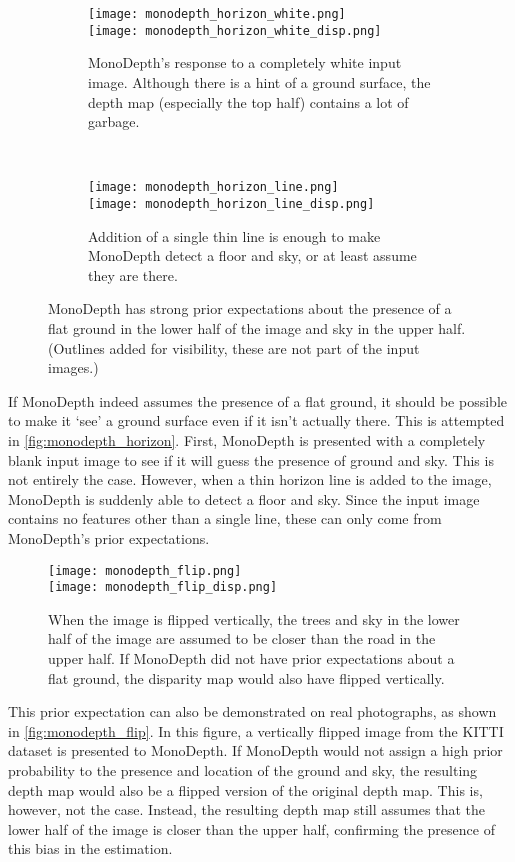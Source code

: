 \begin{figure}
\centering
\begin{subfigure}[t]{0.45\textwidth}
\texttt{[image: monodepth\_horizon\_white.png]}\\
\texttt{[image: monodepth\_horizon\_white\_disp.png]}
\caption{MonoDepth's response to a completely white input image. Although there is a hint of a ground surface, the depth map (especially the top half) contains a lot of garbage.}
\end{subfigure}
~
\begin{subfigure}[t]{0.45\textwidth}
\texttt{[image: monodepth\_horizon\_line.png]}\\
\texttt{[image: monodepth\_horizon\_line\_disp.png]}
\caption{Addition of a single thin line is enough to make MonoDepth detect a floor and sky, or at least assume they are there.}
\end{subfigure}
\caption{MonoDepth has strong prior expectations about the presence of a flat ground in the lower half of the image and sky in the upper half. (Outlines added for visibility, these are not part of the input images.)}
\label{fig:monodepth_horizon}
\end{figure}

If MonoDepth indeed assumes the presence of a flat ground, it should be possible to make it `see' a ground surface even if it isn't actually there.
This is attempted in \autoref{fig:monodepth_horizon}.
First, MonoDepth is presented with a completely blank input image to see if it will guess the presence of ground and sky.
This is not entirely the case.
However, when a thin horizon line is added to the image, MonoDepth is suddenly able to detect a floor and sky.
Since the input image contains no features other than a single line, these can only come from MonoDepth's prior expectations.

\begin{figure}
\centering
\texttt{[image: monodepth\_flip.png]}\\
\texttt{[image: monodepth\_flip\_disp.png]}
\caption{When the image is flipped vertically, the trees and sky in the lower half of the image are assumed to be closer than the road in the upper half. If MonoDepth did not have prior expectations about a flat ground, the disparity map would also have flipped vertically.}
\label{fig:monodepth_flip}
\end{figure}

This prior expectation can also be demonstrated on real photographs, as shown in \autoref{fig:monodepth_flip}.
In this figure, a vertically flipped image from the KITTI dataset is presented to MonoDepth.
If MonoDepth would not assign a high prior probability to the presence and location of the ground and sky, the resulting depth map would also be a flipped version of the original depth map.
This is, however, not the case.
Instead, the resulting depth map still assumes that the lower half of the image is closer than the upper half, confirming the presence of this bias in the estimation.

